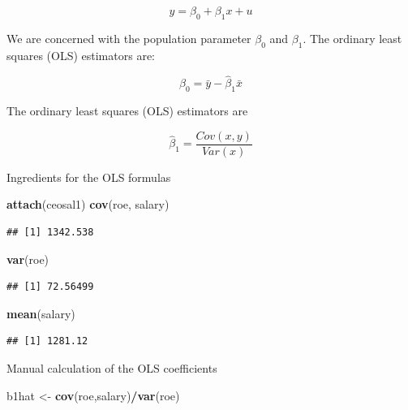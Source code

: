 \documentclass[]{book}
\newenvironment{Shaded}{\begin{snugshade}}{\end{snugshade}}
\newcommand{\KeywordTok}[1]{\textcolor[rgb]{0.13,0.29,0.53}{\textbf{#1}}}
\newcommand{\NormalTok}[1]{#1}
\newcommand{\OperatorTok}[1]{\textcolor[rgb]{0.81,0.36,0.00}{\textbf{#1}}}
\newcommand{\StringTok}[1]{\textcolor[rgb]{0.31,0.60,0.02}{#1}}
\begin{document}
\begin{equation}
y = \beta_{0} + \beta_{1}x + u
\label{eq:simplelinearregressionmodel}
\end{equation}

We are concerned with the population parameter \(\beta_{0}\) and \(\beta_{1}\). The ordinary least squares (OLS) estimators are:

\begin{equation}
\hat{\beta}_{0} = \bar{y} - \hat{\beta}_{1}\bar{x}
\label{eq:populationparameterBeta0}
\end{equation}

The ordinary least squares (OLS) estimators are

\begin{equation}
\hat{\beta}_{1} = \frac{Cov(x,y)}{Var(x)}
\label{eq:populationparameterBeta1}
\end{equation}

Ingredients for the OLS formulas

\begin{Shaded}
\begin{Highlighting}[]
\KeywordTok{attach}\NormalTok{(ceosal1)}
\KeywordTok{cov}\NormalTok{(roe, salary)}
\end{Highlighting}
\end{Shaded}

\begin{verbatim}
## [1] 1342.538
\end{verbatim}

\begin{Shaded}
\begin{Highlighting}[]
\KeywordTok{var}\NormalTok{(roe)}
\end{Highlighting}
\end{Shaded}

\begin{verbatim}
## [1] 72.56499
\end{verbatim}

\begin{Shaded}
\begin{Highlighting}[]
\KeywordTok{mean}\NormalTok{(salary)}
\end{Highlighting}
\end{Shaded}

\begin{verbatim}
## [1] 1281.12
\end{verbatim}

Manual calculation of the OLS coefficients

\begin{Shaded}
\begin{Highlighting}[]
\NormalTok{b1hat <-}\StringTok{ }\KeywordTok{cov}\NormalTok{(roe,salary)}\OperatorTok{/}\KeywordTok{var}\NormalTok{(roe)}
\end{Highlighting}
\end{Shaded}
\end{document}
